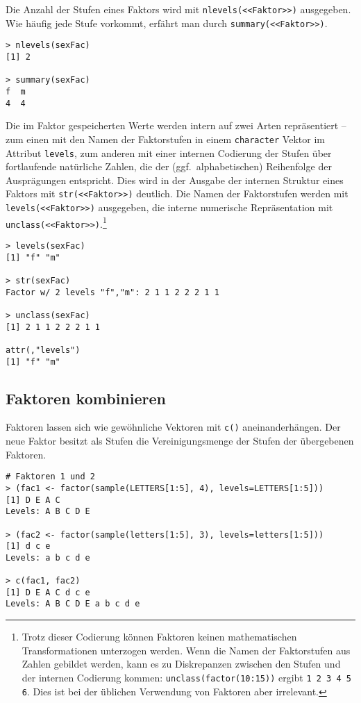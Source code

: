 Die Anzahl der Stufen eines Faktors wird mit \lstinline!nlevels(<<Faktor>>)! ausgegeben. Wie häufig jede Stufe vorkommt, erfährt man durch \lstinline!summary(<<Faktor>>)!.
\begin{lstlisting}
> nlevels(sexFac)
[1] 2

> summary(sexFac)
f  m
4  4
\end{lstlisting}

Die im Faktor gespeicherten Werte werden intern auf zwei Arten repräsentiert -- zum einen mit den Namen der Faktorstufen in einem \lstinline!character! Vektor im Attribut \lstinline!levels!, zum anderen mit einer internen Codierung der Stufen über fortlaufende natürliche Zahlen, die der (ggf.\ alphabetischen) Reihenfolge der Ausprägungen entspricht. Dies wird in der Ausgabe der internen Struktur eines Faktors mit \lstinline!str(<<Faktor>>)! deutlich. Die Namen der Faktorstufen werden mit \lstinline!levels(<<Faktor>>)! ausgegeben, die interne numerische Repräsentation mit \lstinline!unclass(<<Faktor>>)!.\footnote{Trotz dieser Codierung können Faktoren keinen mathematischen Transformationen unterzogen werden. Wenn die Namen der Faktorstufen aus Zahlen gebildet werden, kann es zu Diskrepanzen zwischen den Stufen und der internen Codierung kommen: \lstinline!unclass(factor(10:15))! ergibt \lstinline!1 2 3 4 5 6!. Dies ist bei der üblichen Verwendung von Faktoren aber irrelevant.}
\begin{lstlisting}
> levels(sexFac)
[1] "f" "m"

> str(sexFac)
Factor w/ 2 levels "f","m": 2 1 1 2 2 2 1 1

> unclass(sexFac)
[1] 2 1 1 2 2 2 1 1

attr(,"levels")
[1] "f" "m"
\end{lstlisting}

\subsection{Faktoren kombinieren}
\label{sec:combFac}

Faktoren lassen sich wie gewöhnliche Vektoren mit \lstinline!c()! aneinanderhängen. Der neue Faktor besitzt als Stufen die Vereinigungsmenge der Stufen der übergebenen Faktoren.
\begin{lstlisting}
# Faktoren 1 und 2
> (fac1 <- factor(sample(LETTERS[1:5], 4), levels=LETTERS[1:5]))
[1] D E A C
Levels: A B C D E

> (fac2 <- factor(sample(letters[1:5], 3), levels=letters[1:5]))
[1] d c e
Levels: a b c d e

> c(fac1, fac2)
[1] D E A C d c e
Levels: A B C D E a b c d e
\end{lstlisting}

